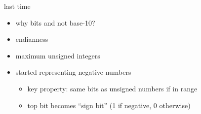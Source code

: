 \begin{frame}{last time}
    \begin{itemize}
    \item why bits and not base-10?
    \item endianness
    \item maximum unsigned integers
    \item started representing negative numbers
        \begin{itemize}
        \item key property: same bits as unsigned numbers if in range
        \item top bit becomes ``sign bit'' (1 if negative, 0 otherwise)
        \end{itemize}
    \end{itemize}
\end{frame}

